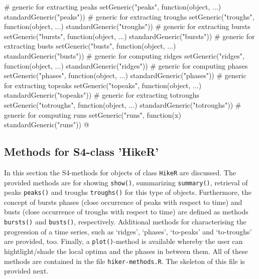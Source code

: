 \documentclass[a4paper]{article}
\begin{document}
\nwenddocs{}\endmoddef\let\nwnotused=\nwoutput{}
# generic for extracting peaks
setGeneric("peaks", function(object, ...) standardGeneric("peaks"))
# generic for extracting troughs
setGeneric("troughs", function(object, ...) standardGeneric("troughs"))
# generic for extracting bursts
setGeneric("bursts", function(object, ...) standardGeneric("bursts"))
# generic for extracting busts
setGeneric("busts", function(object, ...) standardGeneric("busts"))
# generic for computing ridges
setGeneric("ridges", function(object, ...) standardGeneric("ridges"))
# generic for computing phases
setGeneric("phases", function(object, ...) standardGeneric("phases"))
# generic for extracting topeaks
setGeneric("topeaks", function(object, ...) standardGeneric("topeaks"))
# generic for extracting totroughs
setGeneric("totroughs", function(object, ...) standardGeneric("totroughs"))
# generic for computing runs
setGeneric("runs", function(x) standardGeneric("runs"))
\nwnotused{Allgenerics.R}\nwendcode{}@

\subsection{Methods for S4-class 'HikeR'}

In this section the S4-methods for objects of class \verb?HikeR? are
discussed. The provided methods are for showing \verb?show()?,
summarizing \verb?summary()?, retrieval of peaks \verb?peaks()? and troughs
\verb?troughs()? for this type of objects. Furthermore, the concept of
bursts phases (close occurrence of peaks with respect to time) and
busts (close occurrence of troughs with respect to time) are defined
as methods \verb?bursts()? and \verb?busts()?, respectively. Additional
methods for characterising the progression of a time series, such as
`ridges', `phases', `to-peaks' and `to-troughs' are provided,
too. Finally, a \verb?plot()?-method is available whereby the user can
hightlight/shade the local optima and the phases in between them. All
of these methods are contained in the file \verb?hiker-methods.R?. The
skeleton of this file is provided next.
\end{document}
